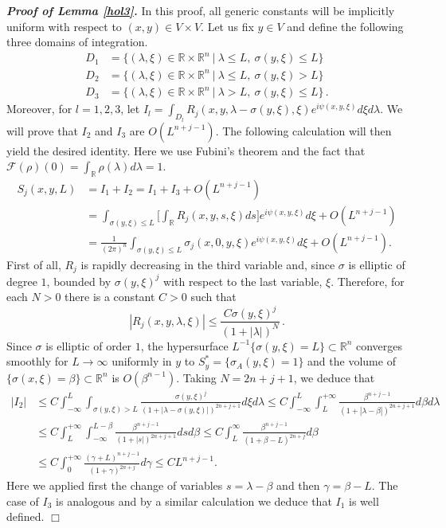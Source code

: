 \documentclass[10pt,twoside]{article}
\newcommand{\fou}{\mathcal{F}}
\newcommand{\R}{\mathbb{R}}
\newenvironment{prf}[1][]
{\vskip 2mm  {\it \bf Proof#1. }}{$\Box$ \vskip 2mm}
\numberwithin{theorem}{section}
\begin{document}
\begin{prf}[ of Lemma \ref{hol3}]
In this proof, all generic constants will be implicitly uniform with respect to $(x,y)\in V\times V$. Let us fix $y\in V$ and define the following three domains of integration.
\begin{align*}
D_1&=\{(\lambda,\xi)\in\R\times \R^n\ |\ \lambda\leq L,\ \sigma(y,\xi)\leq L\}\\
D_2&=\{(\lambda,\xi)\in\R\times \R^n\ |\ \lambda\leq L,\ \sigma(y,\xi)>L\}\\
D_3&=\{(\lambda,\xi)\in\R\times \R^n\ |\ \lambda>L,\ \sigma(y,\xi)\leq L\}\, .
\end{align*}
Moreover, for $l=1,2,3$, let $I_l=\int_{D_l}R_j(x,y,\lambda-\sigma(y,\xi),\xi)e^{i\psi(x,y,\xi)}d\xi d\lambda$. We will prove that $I_2$ and $I_3$ are $O(L^{n+j-1})$. The following calculation will then yield the desired identity. Here we use Fubini's theorem and the fact that $\fou(\rho)(0)=\int_{\R}\rho(\lambda)d\lambda=1$.
\begin{align*}
S_j(x,y,L)&= I_1+I_2= I_1+I_3+O(L^{n+j-1})\\
          &= \int_{\sigma(y,\xi)\leq L}\Big[\int_{\R}R_j(x,y,s,\xi)ds\Big]e^{i\psi(x,y,\xi)}d\xi+O(L^{n+j-1})\\
          &= \frac{1}{(2\pi)^n}\int_{\sigma(y,\xi)\leq L}\sigma_j(x,0,y,\xi)e^{i\psi(x,y,\xi)}d\xi+O(L^{n+j-1}).
\end{align*}
First of all, $R_j$ is rapidly decreasing in the third variable and, since $\sigma$ is elliptic of degree $1$, bounded by $\sigma(y,\xi)^j$ with respect to the last variable, $\xi$. Therefore, for each $N>0$ there is a constant $C>0$ such that
\[|R_j(x,y,\lambda,\xi)|\leq \frac{C \sigma(y,\xi)^j}{(1+|\lambda|)^N}\,.\]
Since $\sigma$ is elliptic of order $1$, the hypersurface $L^{-1}\{\sigma(y,\xi)=L\}\subset \R^n$ converges smoothly for $L\rightarrow\infty$ uniformly in $y$ to $S^*_y=\{\sigma_A(y,\xi)=1\}$ and the volume of $\{\sigma(x,\xi)= \beta\}\subset \R^n$ is $O(\beta^{n-1})$. Taking $N= 2n+j+1$, we deduce that
\begin{align*}
|I_2|&\leq C\int_{-\infty}^L\int_{\sigma(y,\xi)>L}\frac{\sigma(y,\xi)^j}{(1+|\lambda-\sigma(y,\xi)|)^{2n+j+1}}d\xi d\lambda\leq C\int_{-\infty}^L\int_L^{+\infty}\frac{\beta^{n+j-1}}{(1+|\lambda-\beta|)^{2n+j+1}}d\beta d\lambda\\
     &\leq C\int_L^{+\infty} \int_{-\infty}^{L-\beta}\frac{\beta^{n+j-1}}{(1+|s|)^{2n+j+1}}dsd\beta\leq C\int_L^\infty \frac{\beta^{n+j-1}}{(1+\beta-L)^{2n+j}}d\beta\\
     &\leq C\int_0^{+\infty} \frac{(\gamma+L)^{n+j-1}}{(1+\gamma)^{2n+j}}d\gamma\leq C L^{n+j-1}.
\end{align*}
Here we applied first the change of variables $s=\lambda-\beta$ and then $\gamma=\beta-L$. The case of $I_3$ is analogous and by a similar calculation we deduce that $I_1$ is well defined.
\end{prf}
\end{document}
